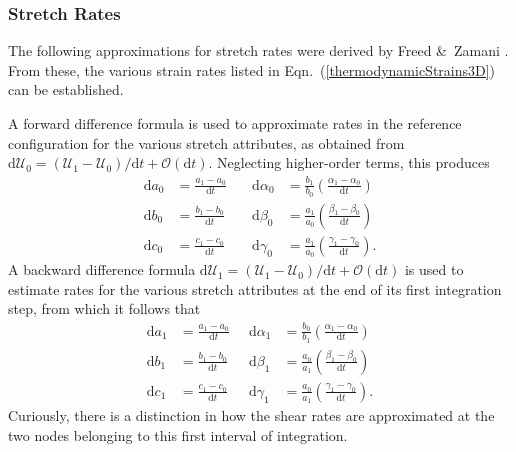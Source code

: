 \subsubsection{Stretch Rates}

The following approximations for stretch rates were derived by Freed \&\ Zamani \cite{FreedZamani18}.  From these, the various strain rates listed in Eqn.~(\ref{thermodynamicStrains3D}) can be established.  

A forward difference formula is used to approximate rates in the reference configuration for the various stretch attributes, as obtained from $\mathrm{d} \boldsymbol{\mathcal{U}}_0 = ( \boldsymbol{\mathcal{U}}_1 -  \boldsymbol{\mathcal{U}}_0 ) / \mathrm{d}t + \mathcal{O}(\mathrm{d}t)$.  Neglecting higher-order terms, this produces
\begin{equation}
\begin{aligned}
\mathrm{d} a_0 &
= \frac {a_1 - a_0}{\mathrm{d}t} \quad &
\mathrm{d} \alpha_0 & 
= \frac{b_1}{b_0} \left(\frac{\alpha_1 - \alpha_0}{\mathrm{d}t} \right) \\
\mathrm{d} b_0 & 
= \frac {b_1 - b_0}{\mathrm{d}t} \quad & 
\mathrm{d} \beta_0 & 
= \frac{a_1}{a_0} \left( \frac{\beta_1 - \beta_0}{\mathrm{d}t} \right) \\
\mathrm{d} c_0 & 
= \frac {c_1 - c_0}{\mathrm{d}t} \quad & 
\mathrm{d} \gamma_0 & = \frac{a_1}{a_0} \left( \frac{\gamma_1 - \gamma_0}{\mathrm{d}t}\right) .
\end{aligned}
\label{forwardDifference1stOrder3D}
\end{equation}
A backward difference formula $\mathrm{d} \boldsymbol{\mathcal{U}}_1 = ( \boldsymbol{\mathcal{U}}_1 -  \boldsymbol{\mathcal{U}}_0 ) / \mathrm{d}t + \mathcal{O}(\mathrm{d}t)$ is used to estimate rates for the various stretch attributes at the end of its first integration step, from which it follows that
\begin{equation}
\begin{aligned}
\mathrm{d} a_1 & 
= \frac {a_1 - a_0}{\mathrm{d}t} \;\; & 
\mathrm{d} \alpha_1 & 
= \frac {b_0}{b_1} \left( \frac{\alpha_1 - \alpha_0}{\mathrm{d}t} \right) \\
\mathrm{d} b_1 & 
= \frac {b_1 - b_0}{\mathrm{d}t} \;\; & 
\mathrm{d} \beta_1 & 
= \frac {a_0} {a_1} \left( \frac{\beta_1 - \beta_0}{\mathrm{d}t} \right) \\
\mathrm{d} c_1 & 
= \frac {c_1 - c_0}{\mathrm{d}t} \;\; & 
\mathrm{d} \gamma_1 & 
= \frac{a_0}{a_1} \left(\frac{\gamma_1 - \gamma_0}{\mathrm{d}t} \right) .
\end{aligned}
\label{backwardDifference1stOrder3D}
\end{equation}
Curiously, there is a distinction in how the shear rates are approximated at the two nodes belonging to this first interval of integration.

